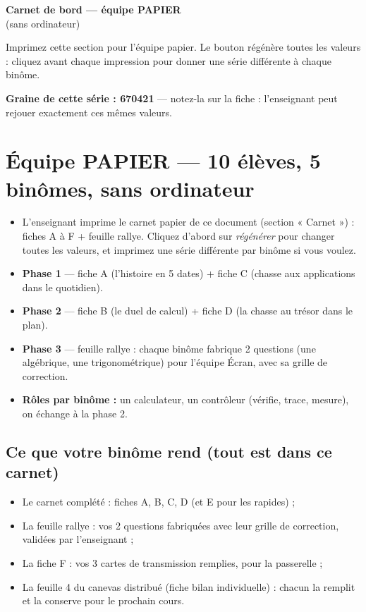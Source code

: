 \documentclass[11pt,a4paper]{article}
\begin{document}
\begin{center}
  {\LARGE\bfseries Carnet de bord --- équipe PAPIER}\\[2pt]
  {\large (sans ordinateur)}
\end{center}

Imprimez cette section pour l'équipe papier. Le bouton régénère toutes les
valeurs : cliquez avant chaque impression pour donner une série différente à
chaque binôme.

\textbf{Graine de cette série : 670421} --- notez-la sur la fiche : l'enseignant
peut rejouer exactement ces mêmes valeurs.

\section*{Équipe PAPIER --- 10 élèves, 5 binômes, sans ordinateur}

\begin{itemize}
  \item L'enseignant imprime le carnet papier de ce document (section
        « Carnet ») : fiches A à F + feuille rallye. Cliquez d'abord sur
        \emph{régénérer} pour changer toutes les valeurs, et imprimez une série
        différente par binôme si vous voulez.
  \item \textbf{Phase 1} --- fiche A (l'histoire en 5 dates) + fiche C
        (chasse aux applications dans le quotidien).
  \item \textbf{Phase 2} --- fiche B (le duel de calcul) + fiche D
        (la chasse au trésor dans le plan).
  \item \textbf{Phase 3} --- feuille rallye : chaque binôme fabrique 2 questions
        (une algébrique, une trigonométrique) pour l'équipe Écran, avec sa
        grille de correction.
  \item \textbf{Rôles par binôme :} un calculateur, un contrôleur (vérifie,
        trace, mesure), on échange à la phase 2.
\end{itemize}

\subsection*{Ce que votre binôme rend (tout est dans ce carnet)}

\begin{itemize}
  \item Le carnet complété : fiches A, B, C, D (et E pour les rapides) ;
  \item La feuille rallye : vos 2 questions fabriquées avec leur grille de
        correction, validées par l'enseignant ;
  \item La fiche F : vos 3 cartes de transmission remplies, pour la passerelle ;
  \item La feuille 4 du canevas distribué (fiche bilan individuelle) : chacun
        la remplit et la conserve pour le prochain cours.
\end{itemize}
\end{document}
